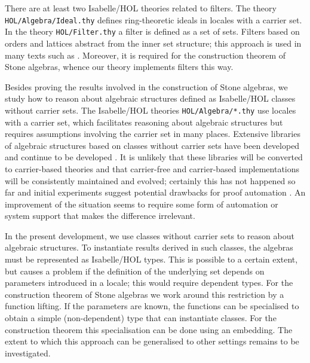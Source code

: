 \documentclass[11pt,a4paper]{article}
\begin{document}
There are at least two Isabelle/HOL theories related to filters.
The theory \texttt{HOL/Algebra/Ideal.thy} defines ring-theoretic ideals in locales with a carrier set.
In the theory \texttt{HOL/Filter.thy} a filter is defined as a set of sets.
Filters based on orders and lattices abstract from the inner set structure; this approach is used in many texts such as \cite{BalbesDwinger1974,Birkhoff1967,Blyth2005,DaveyPriestley2002,Graetzer1971}.
Moreover, it is required for the construction theorem of Stone algebras, whence our theory implements filters this way.

Besides proving the results involved in the construction of Stone algebras, we study how to reason about algebraic structures defined as Isabelle/HOL classes without carrier sets.
The Isabelle/HOL theories \texttt{HOL/Algebra/*.thy} use locales with a carrier set, which facilitates reasoning about algebraic structures but requires assumptions involving the carrier set in many places.
Extensive libraries of algebraic structures based on classes without carrier sets have been developed and continue to be developed \cite{ArmstrongFosterStruthWeber2016,ArmstrongGomesStruth2016,ArmstrongGomesStruthWeber2016,DivasonAransay2016,FosterStruth2016,FurusawaStruth2016,GeorgescuLeusteanPreoteasa2016,GomesGuttmannHoefnerStruthWeber2016,GomesStruth2016,Guttmann2015a,KleinKolanskiBoyton2016,Preoteasa2016b,Preoteasa2016a,WamplerDoty2016}.
It is unlikely that these libraries will be converted to carrier-based theories and that carrier-free and carrier-based implementations will be consistently maintained and evolved; certainly this has not happened so far and initial experiments suggest potential drawbacks for proof automation \cite{FosterStruthWeber2011}.
An improvement of the situation seems to require some form of automation or system support that makes the difference irrelevant.

In the present development, we use classes without carrier sets to reason about algebraic structures.
To instantiate results derived in such classes, the algebras must be represented as Isabelle/HOL types.
This is possible to a certain extent, but causes a problem if the definition of the underlying set depends on parameters introduced in a locale; this would require dependent types.
For the construction theorem of Stone algebras we work around this restriction by a function lifting.
If the parameters are known, the functions can be specialised to obtain a simple (non-dependent) type that can instantiate classes.
For the construction theorem this specialisation can be done using an embedding.
The extent to which this approach can be generalised to other settings remains to be investigated.

\begin{flushleft}

\end{flushleft}



\end{document}
